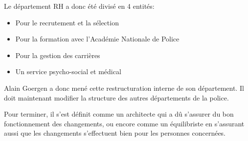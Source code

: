 Le département RH a donc été divisé en 4 entités:
\begin{itemize}
	\item Pour le recrutement et la sélection
	\item Pour la formation avec l'Académie Nationale de Police
	\item Pour la gestion des carrières
	\item Un service psycho-social et médical\newline
\end{itemize}

Alain Goergen a donc mené cette restructuration interne de son département. Il doit maintenant modifier la structure des autres départements de la police.\newline

Pour terminer, il s'est définit comme un architecte qui a dû s'assurer du bon fonctionnement des changements, ou encore comme un équilibriste en s'assurant aussi que les changements s'effectuent bien pour les personnes concernées.\newline
